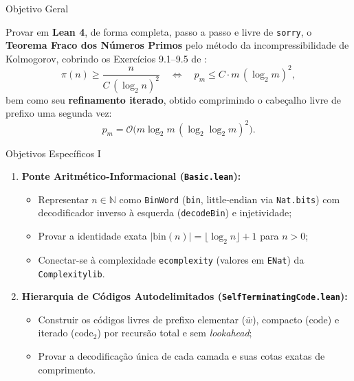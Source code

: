 \documentclass[10pt, aspectratio=43]{beamer}
\begin{document}
\begin{frame}{Objetivo Geral}
    \begin{tcolorbox}[pucbox, title=Weak PNT Mecanicamente Verificado via Incompressibilidade]
        Provar em \textbf{Lean 4}, de forma completa, passo a passo e livre de \texttt{sorry}, o \textbf{Teorema Fraco dos Números Primos} pelo método da incompressibilidade de Kolmogorov, cobrindo os Exercícios 9.1--9.5 de :
        \begin{equation*}
            \pi(n) \ge \frac{n}{C\,(\log_2 n)^2} \quad\Longleftrightarrow\quad p_m \le C \cdot m\,(\log_2 m)^2,
        \end{equation*}
        bem como seu \textbf{refinamento iterado}, obtido comprimindo o cabeçalho livre de prefixo uma segunda vez:
        \begin{equation*}
            p_m = \mathcal{O}\big(m \log_2 m\,(\log_2\log_2 m)^2\big).
        \end{equation*}
    \end{tcolorbox}
\end{frame}

\begin{frame}{Objetivos Específicos I}
\begin{enumerate}
    \item \textbf{Ponte Aritmético-Informacional (\texttt{Basic.lean}):}
    \begin{itemize}
        \item Representar $n \in \mathbb{N}$ como \texttt{BinWord} (\texttt{bin}, little-endian via \texttt{Nat.bits}) com decodificador inverso à esquerda (\texttt{decodeBin}) e injetividade;
        \item Provar a identidade exata $|\text{bin}(n)| = \lfloor\log_2 n\rfloor + 1$ para $n > 0$;
        \item Conectar-se à complexidade \texttt{ecomplexity} (valores em \texttt{ENat}) da \texttt{Complexitylib}.
    \end{itemize}
    \medskip
    \item \textbf{Hierarquia de Códigos Autodelimitados (\texttt{SelfTerminatingCode.lean}):}
    \begin{itemize}
        \item Construir os códigos livres de prefixo elementar ($\overline{w}$), compacto ($\text{code}$) e iterado ($\text{code}_2$) por recursão total e sem \textit{lookahead};
        \item Provar a decodificação única de cada camada e suas cotas exatas de comprimento.
    \end{itemize}
\end{enumerate}
\end{frame}
\end{document}
